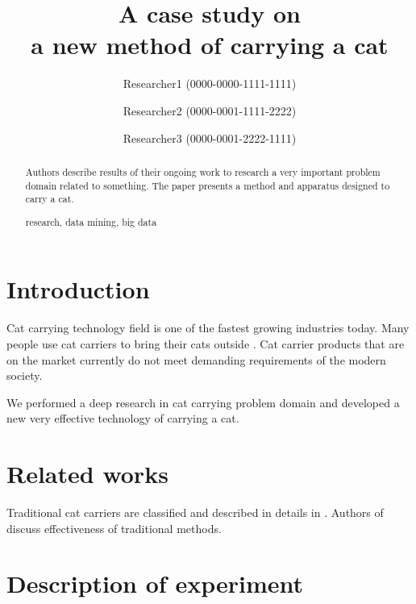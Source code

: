 \documentclass[runningheads,a4paper]{llncs}
\newcommand{\keywords}[1]{\par\addvspace\baselineskip
\noindent\keywordname\enspace\ignorespaces#1}
\begin{document}
\mainmatter  %

\title{A case study on\\
a new method of carrying a cat}


\author{Researcher1 (0000-0000-1111-1111)
\and Researcher2 (0000-0001-1111-2222)\and Researcher3 (0000-0001-2222-1111)}
%


\maketitle


\begin{abstract}
  Authors describe results of their ongoing work to research a very important
  problem domain related to something. The paper presents a method and apparatus
  designed to carry a cat.
\keywords{research, data mining, big data}
\end{abstract}


\section{Introduction}

Cat carrying technology field is one of the fastest growing industries today.
Many people use cat carriers to bring their cats outside \cite{item01}.
Cat carrier products that are on the market currently do not meet demanding
requirements of the modern society.

We performed a deep research in cat carrying problem domain and developed a new
very effective technology of carrying a cat.

\section{Related works}

Traditional cat carriers are classified and described in details in
\cite{item01}. Authors of \cite{item02} discuss effectiveness of traditional methods. 

\section{Description of experiment}
\end{document}
